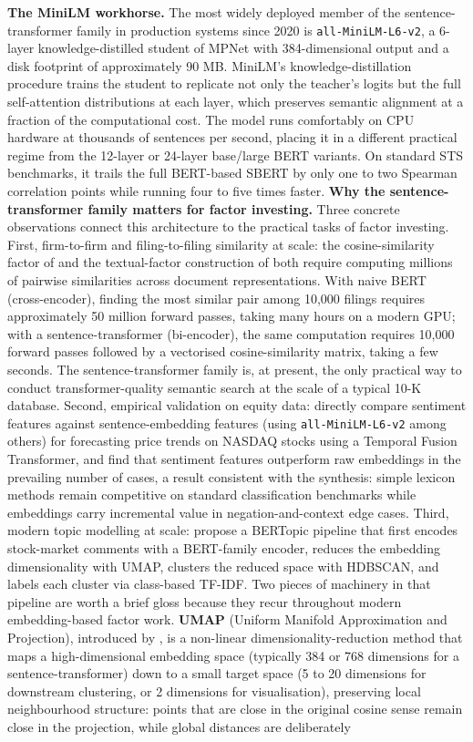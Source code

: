 \textbf{The MiniLM workhorse.} The most widely deployed member of the sentence-transformer family in production systems since 2020 is \texttt{all-MiniLM-L6-v2}, a 6-layer knowledge-distilled student of MPNet with 384-dimensional output and a disk footprint of approximately 90 MB. MiniLM's knowledge-distillation procedure trains the student to replicate not only the teacher's logits but the full self-attention distributions at each layer, which preserves semantic alignment at a fraction of the computational cost. The model runs comfortably on CPU hardware at thousands of sentences per second, placing it in a different practical regime from the 12-layer or 24-layer base/large BERT variants. On standard STS benchmarks, it trails the full BERT-based SBERT by only one to two Spearman correlation points while running four to five times faster.
\textbf{Why the sentence-transformer family matters for factor investing.} Three concrete observations connect this architecture to the practical tasks of factor investing. First, firm-to-firm and filing-to-filing similarity at scale: the cosine-similarity factor of \cite{hoberg2016text} and the textual-factor construction of \cite{cong2019textual} both require computing millions of pairwise similarities across document representations. With naive BERT (cross-encoder), finding the most similar pair among 10,000 filings requires approximately 50 million forward passes, taking many hours on a modern GPU; with a sentence-transformer (bi-encoder), the same computation requires 10,000 forward passes followed by a vectorised cosine-similarity matrix, taking a few seconds. The sentence-transformer family is, at present, the only practical way to conduct transformer-quality semantic search at the scale of a typical 10-K database. Second, empirical validation on equity data: \cite{zaichenko2023battle} directly compare sentiment features against sentence-embedding features (using \texttt{all-MiniLM-L6-v2} among others) for forecasting price trends on NASDAQ stocks using a Temporal Fusion Transformer, and find that sentiment features outperform raw embeddings in the prevailing number of cases, a result consistent with the \cite{lis2024investor} synthesis: simple lexicon methods remain competitive on standard classification benchmarks while embeddings carry incremental value in negation-and-context edge cases. Third, modern topic modelling at scale: \cite{zhu2024bertopic} propose a BERTopic pipeline that first encodes stock-market comments with a BERT-family encoder, reduces the embedding dimensionality with UMAP, clusters the reduced space with HDBSCAN, and labels each cluster via class-based TF-IDF. Two pieces of machinery in that pipeline are worth a brief gloss because they recur throughout modern embedding-based factor work. \textbf{UMAP} (Uniform Manifold Approximation and Projection), introduced by \cite{mcinnes2018umap}, is a non-linear dimensionality-reduction method that maps a high-dimensional embedding space (typically 384 or 768 dimensions for a sentence-transformer) down to a small target space (5 to 20 dimensions for downstream clustering, or 2 dimensions for visualisation), preserving local neighbourhood structure: points that are close in the original cosine sense remain close in the projection, while global distances are deliberately 